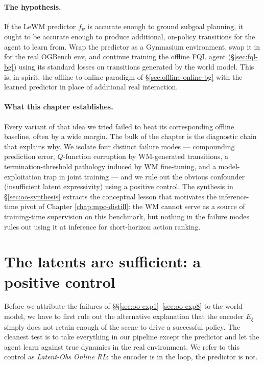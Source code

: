\paragraph{The hypothesis.} If the LeWM predictor $f_\psi$ is accurate enough to ground subgoal planning, it ought to be accurate enough to produce additional, on-policy transitions for the agent to learn from. Wrap the predictor as a Gymnasium environment, swap it in for the real OGBench env, and continue training the offline FQL agent (\S\ref{sec:fql-bg}) using its standard losses on transitions generated by the world model. This is, in spirit, the offline-to-online paradigm of \S\ref{sec:offline-online-bg} with the learned predictor in place of additional real interaction.

\paragraph{What this chapter establishes.} Every variant of that idea we tried failed to beat its corresponding offline baseline, often by a wide margin. The bulk of the chapter is the diagnostic chain that explains why. We isolate four distinct failure modes --- compounding prediction error, $Q$-function corruption by WM-generated transitions, a termination-threshold pathology induced by WM fine-tuning, and a model-exploitation trap in joint training --- and we rule out the obvious confounder (insufficient latent expressivity) using a positive control. The synthesis in \S\ref{sec:oo-synthesis} extracts the conceptual lesson that motivates the inference-time pivot of Chapter \ref{chap:mpc-distill}: the WM cannot serve as a source of training-time supervision on this benchmark, but nothing in the failure modes rules out using it at inference for short-horizon action ranking.

\section{The latents are sufficient: a positive control}
\label{sec:oo-b2}

Before we attribute the failures of \S\S\ref{sec:oo-exp1}--\ref{sec:oo-exp8} to the world model, we have to first rule out the alternative explanation that the encoder $E_\xi$ simply does not retain enough of the scene to drive a successful policy. The cleanest test is to take everything in our pipeline except the predictor and let the agent learn against true dynamics in the real environment. We refer to this control as \emph{Latent-Obs Online RL}: the encoder is in the loop, the predictor is not.

